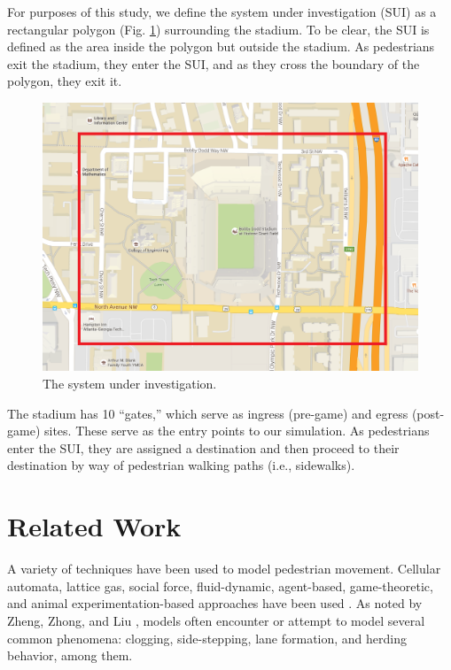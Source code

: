 \documentclass[12pt]{article}
\begin{document}
For purposes of this study, we define the system under investigation (SUI) as a
rectangular polygon (Fig. \ref{fig:polygon}) surrounding the stadium. To be
clear, the SUI is defined as the area inside the polygon but outside the
stadium. As pedestrians exit the stadium, they enter the SUI, and as they cross
the boundary of the polygon, they exit it.

\begin{figure}[H]
  \includegraphics[width=\linewidth,natwidth=1036,natheight=742]{cropped_map.png}
  \caption{The system under investigation.}
  \label{fig:polygon}
\end{figure}

The stadium has 10 ``gates,'' which serve as ingress (pre-game) and egress
(post-game) sites. These serve as the entry points to our simulation. As
pedestrians enter the SUI, they are assigned a destination and then proceed
to their destination by way of pedestrian walking paths (i.e., sidewalks).

\section{Related Work}
\label{sec:literature}

A variety of techniques have been used to model pedestrian movement. Cellular
automata, lattice gas, social force, fluid-dynamic, agent-based, game-theoretic,
and animal experimentation-based approaches have been used
\cite{zheng2009modeling}. As noted by Zheng, Zhong, and Liu
\cite{zheng2009modeling}, models often encounter or attempt to model several
common phenomena: clogging, side-stepping, lane formation, and herding
behavior, among them.
\end{document}
